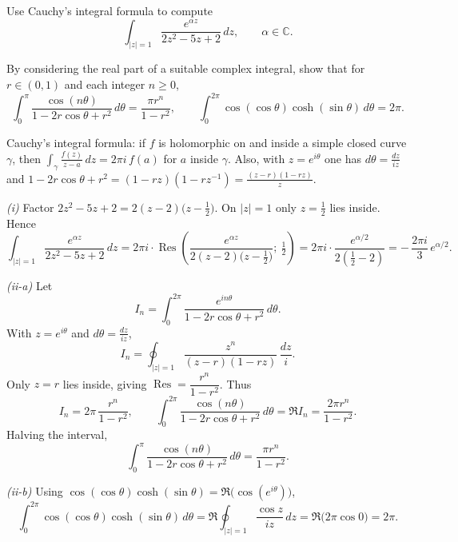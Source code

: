 \begin{problem}[CP-IV-0031]
\label{prob:cp-iv-0031}
\par\noindent\textbullet\quad Use Cauchy’s integral formula to compute
	\[
	\int_{|z|=1}\frac{e^{\alpha z}}{2z^{2}-5z+2}\,dz,\qquad \alpha\in\mathbb C.
	\]

	\par\noindent\textbullet\quad By considering the real part of a suitable complex integral, show that for $r\in(0,1)$ and each integer $n\ge0$,
	\[
	\int_{0}^{\pi}\frac{\cos(n\theta)}{1-2r\cos\theta+r^{2}}\,d\theta=\frac{\pi r^{n}}{1-r^{2}},
	\qquad
	\int_{0}^{2\pi}\cos(\cos\theta)\cosh(\sin\theta)\,d\theta=2\pi .
	\]

Cauchy’s integral formula: if $f$ is holomorphic on and inside a simple closed curve $\gamma$, then
$\displaystyle \int_\gamma \frac{f(z)}{z-a}\,dz=2\pi i\,f(a)$ for $a$ inside $\gamma$.
Also, with $z=e^{i\theta}$ one has $d\theta=\frac{dz}{iz}$ and
$1-2r\cos\theta+r^{2}=(1-rz)(1-rz^{-1})=\frac{(z-r)(1-rz)}{z}$.
\end{problem}



\begin{solution}
\emph{(i)} Factor $2z^{2}-5z+2=2(z-2)\bigl(z-\tfrac12\bigr)$. On $|z|=1$ only $z=\tfrac12$ lies inside.
Hence
\[
\int_{|z|=1}\frac{e^{\alpha z}}{2z^{2}-5z+2}\,dz
=2\pi i\cdot \operatorname{Res}\!\left(\frac{e^{\alpha z}}{2(z-2)\bigl(z-\tfrac12\bigr)};\ \tfrac12\right)
=2\pi i\cdot \frac{e^{\alpha/2}}{2(\tfrac12-2)}
=-\,\frac{2\pi i}{3}\,e^{\alpha/2}.
\]

\medskip
\emph{(ii-a)} Let
\[
I_n=\int_{0}^{2\pi}\frac{e^{in\theta}}{1-2r\cos\theta+r^{2}}\,d\theta.
\]
With $z=e^{i\theta}$ and $d\theta=\frac{dz}{iz}$,
\[
I_n=\oint_{|z|=1}\frac{z^{n}}{(z-r)(1-rz)}\,\frac{dz}{i}.
\]
Only $z=r$ lies inside, giving $\operatorname{Res}=\dfrac{r^{n}}{1-r^{2}}$. Thus
\[
I_n=2\pi\,\frac{r^{n}}{1-r^{2}},\qquad
\int_{0}^{2\pi}\frac{\cos(n\theta)}{1-2r\cos\theta+r^{2}}\,d\theta
=\Re I_n=\frac{2\pi r^{n}}{1-r^{2}}.
\]
Halving the interval,
\[
\int_{0}^{\pi}\frac{\cos(n\theta)}{1-2r\cos\theta+r^{2}}\,d\theta
=\frac{\pi r^{n}}{1-r^{2}}.
\]

\medskip
\emph{(ii-b)} Using
$\cos(\cos\theta)\cosh(\sin\theta)=\Re\bigl(\cos(e^{i\theta})\bigr)$,
\[
\int_{0}^{2\pi}\cos(\cos\theta)\cosh(\sin\theta)\,d\theta
=\Re\oint_{|z|=1}\frac{\cos z}{iz}\,dz
=\Re\bigl(2\pi\cos 0\bigr)=2\pi.
\]
\end{solution}

